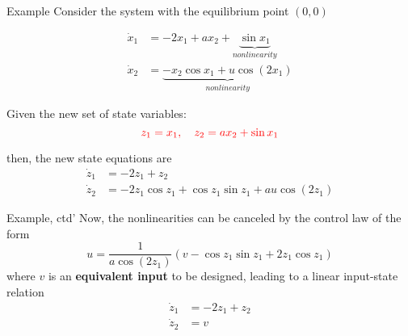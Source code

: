 \documentclass{beamer}
\begin{document}
  \begin{frame}{Example}
  Consider the system with the equilibrium point $(0, 0)$

  \begin{equation}\label{input-state-example}
  \begin{aligned}
    \dot{x}_{1} &= -2x_{1}+ax_{2}+\underbrace{\sin x_{1}}_{nonlinearity} \\
    \dot{x}_{2} &= \underbrace{-x_{2}\cos x_{1} + u \cos(2x_{1})}_{nonlinearity}
  \end{aligned}
  \end{equation}

  Given the new set of state variables:
  $$ {\color{red} z_{1}=x_{1} , \quad z_{2}=ax_{2} + \sin x_{1}} $$

  then, the new state equations are
    \begin{equation}\label{new-state}
      \begin{aligned}
        \dot{z}_{1} &= -2 z_{1}+z_{2} \\
        \dot{z}_{2} &= -2 z_{1} \cos z_{1}+\cos z_{1} \sin z_{1}+a u \cos \left(2 z_{1}\right)
      \end{aligned}
    \end{equation}
  \end{frame}


  \begin{frame}{Example, ctd'}
  Now, the nonlinearities can be canceled by the control law of the form
  $$
    u=\frac{1}{a \cos \left(2 z_{1}\right)}\left(v-\cos z_{1} \sin z_{1}+2 z_{1} \cos z_{1}\right)
  $$
  where $v$ is an \textbf{equivalent input} to be designed, leading to a linear input-state relation
  \begin{equation}\label{input-state-relation}
    \begin{aligned}
      \dot{z}_{1} &= -2z_{1} + z_{2} \\
      \dot{z}_{2} &= v
    \end{aligned}
  \end{equation}
  \vspace{-10pt}
\begin{figure}
  \centering
    \end{figure}
  \end{frame}
\end{document}
